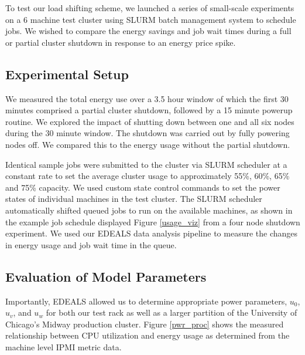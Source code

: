 To test our load shifting scheme, we launched a series of small-scale experiments on a 6 machine test cluster using SLURM batch management system to schedule jobs. We wished to compare the energy savings and job wait times during a full or partial cluster shutdown in response to an energy price spike.

\subsection{Experimental Setup}

We measured the total energy use over a 3.5 hour window of which the first 30 minutes comprised a partial cluster shutdown, followed by a 15 minute powerup routine. We explored the impact of shutting down between one and all six nodes during the 30 minute window. The shutdown was carried out by fully powering nodes off.  We compared this to the energy usage without the partial shutdown.

Identical sample jobs were submitted to the cluster via SLURM scheduler at a constant rate to set the average cluster usage to approximately 55\%, 60\%, 65\% and 75\% capacity.  We used custom state control commands to set the power states of individual machines in the test cluster.  The SLURM scheduler automatically shifted queued jobs to run on the available machines, as shown in the example job schedule displayed Figure \ref{usage_viz} from a four node shutdown experiment. We used our EDEALS data analysis pipeline to measure the changes in energy usage and job wait time in the queue.

\subsection{Evaluation of Model Parameters}

Importantly, EDEALS allowed us to determine appropriate power parameters, $u_0$, $u_v$, and $u_w$ for both our test rack as well as a larger partition of the University of Chicago's Midway production cluster.  Figure \ref{pwr_proc} shows the measured relationship between CPU utilization and energy usage as determined from the machine level IPMI metric data.


